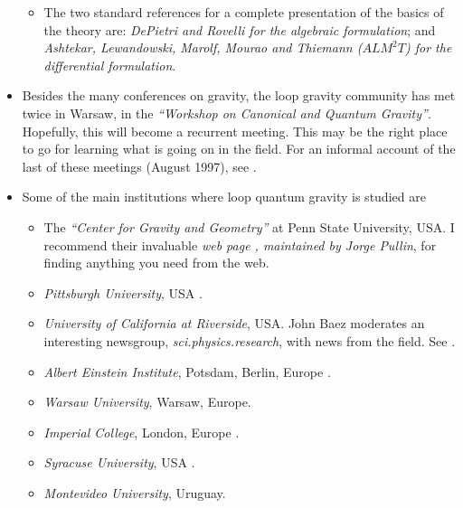 \begin{itemize}
\begin{itemize}
\item The two standard references for a complete presentation of 
the basics of the theory are: {\em DePietri and Rovelli 
\cite{DePietriRovelli} for the algebraic formulation}; and 
{\em Ashtekar, Lewandowski, Marolf, Mourao and Thiemann ($ALM^2T$) 
\cite{AshtekarEtAl95} for the differential formulation}. 

\end{itemize}

\item Besides the many conferences on gravity, the loop gravity 
community has met twice in Warsaw, in the {\em ``Workshop on Canonical 
and Quantum Gravity''}.  Hopefully, this will become a recurrent  
meeting.  This may be the right place to go for learning what is 
going on in the field.  For an informal account of the last of 
these meetings (August 1997), see \cite{RovelliMoG}.

\item Some of the main institutions where loop quantum gravity is 
studied are

\begin{itemize}

\item The {\em ``Center for Gravity and Geometry''} at Penn State 
University, USA. I recommend their invaluable {\em web page 
\cite{PennState}, maintained by Jorge Pullin}, for finding 
anything you need from the web.

\item  \emph{Pittsburgh University}, USA \cite{Pittsburgh}.

\item \emph{University of California at Riverside}, USA. John Baez 
moderates an interesting newsgroup, \emph{sci.physics.research}, 
with news from the field.  See \cite{John}.

\item \emph{Albert Einstein Institute}, Potsdam, Berlin, Europe 
\cite{Potsdam}.

\item \emph{Warsaw University}, Warsaw, Europe.

\item \emph{Imperial College}, London, Europe \cite{Imperial}.

\item \emph{Syracuse University}, USA \cite{Syracuse}.

\item \emph{Montevideo University}, Uruguay. 

\end{itemize}

\end{itemize}

